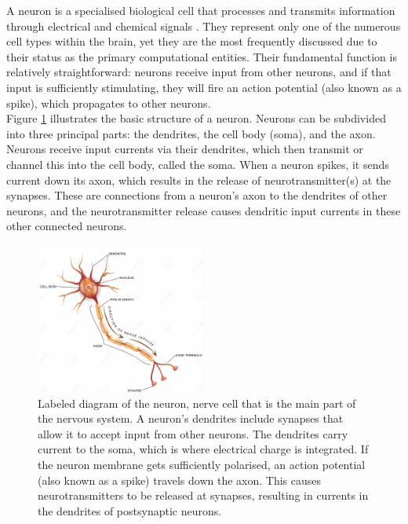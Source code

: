 \noindent  A neuron is a specialised biological cell that processes and transmits information through electrical and chemical signals \cite{mel1994information}. They represent only one of the numerous cell types within the brain, yet they are the most frequently discussed due to their status as the primary computational entities. Their fundamental function is relatively straightforward: neurons receive input from other neurons, and if that input is sufficiently stimulating, they will fire an action potential (also known as a spike), which propagates to other neurons.\\

\noindent Figure \ref{fig:1a} illustrates the basic structure of a neuron. Neurons can be subdivided into three principal parts: the dendrites, the cell body (soma), and the axon. Neurons receive input currents via their dendrites, which then transmit or channel this into the cell body, called the soma. When a neuron spikes, it sends current down its axon, which results in the release of neurotransmitter(s) at the synapses. These are connections from a neuron's axon to the dendrites of other neurons, and the neurotransmitter release causes dendritic input currents in these other connected neurons. \\

\begin{figure}[htbp!] 
    \centering    
    \includegraphics[width=0.5\textwidth]{Chapter1/Figs/1a.png}
    \caption[Labeled diagram of the neuron.]{Labeled diagram of the neuron, nerve cell that is the main part of the nervous system. A neuron's dendrites include synapses that allow it to accept input from other neurons. The dendrites carry current to the soma, which is where electrical charge is integrated. If the neuron membrane gets sufficiently polarised, an action potential (also known as a spike) travels down the axon. This causes neurotransmitters to be released at synapses, resulting in currents in the dendrites of postsynaptic neurons.}
    \label{fig:1a}
    \end{figure}

